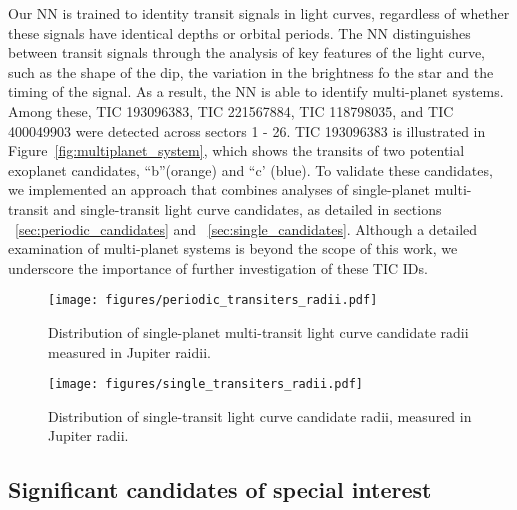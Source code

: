 Our NN is trained to identity transit signals in light curves, regardless of whether these signals have identical depths or orbital periods. The NN distinguishes between transit signals through the analysis of key features of the light curve, such as the shape of the dip, the variation in the brightness fo the star and the timing of the signal. As a result, the NN is able to identify multi-planet systems. Among these, TIC 193096383, TIC 221567884, TIC 118798035, and TIC 400049903 were detected across sectors 1 - 26. TIC 193096383 is illustrated in Figure~\ref{fig:multiplanet_system}, which shows the transits of two potential exoplanet candidates, ``b''(orange) and ``c' (blue). To validate these candidates, we implemented an approach that combines analyses of single-planet multi-transit and single-transit light curve candidates, as detailed in sections ~\ref{sec:periodic_candidates} and ~\ref{sec:single_candidates}. Although a detailed examination of multi-planet systems is beyond the scope of this work, we underscore the importance of further investigation of these TIC IDs. \par

\begin{figure}
\begin{center}
\vspace{5mm}
\texttt{[image: figures/periodic\_transiters\_radii.pdf]}
\vspace{-2mm} 
\caption{\label{fig:periodic_transiters_radii}
Distribution of single-planet multi-transit light curve candidate radii measured in Jupiter raidii.}
\vspace{-1mm}
\end{center}
\end{figure}


\begin{figure}
\begin{center}
\vspace{5mm}
\texttt{[image: figures/single\_transiters\_radii.pdf]}
\vspace{-2mm} 
\caption{\label{fig:single_transiters_radii}
Distribution of single-transit light curve candidate radii, measured in Jupiter radii.}
\vspace{-1mm}
\end{center}
\end{figure}

\subsection{Significant candidates of special interest}

